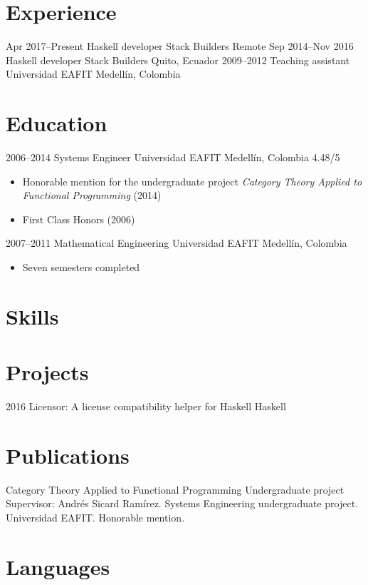 \documentclass[12pt,letterpaper,sans]{moderncv}
\begin{document}
\makecvtitle

\section{Experience}

\cventry
  {Apr 2017--Present}
  {Haskell developer}
  {Stack Builders}
  {Remote}
  {}
  {}
\cventry
  {Sep 2014--Nov 2016}
  {Haskell developer}
  {Stack Builders}
  {Quito, Ecuador}
  {}
  {}
\cventry
  {2009--2012}
  {Teaching assistant}
  {Universidad EAFIT}
  {Medellín, Colombia}
  {}
  {}

\section{Education}

\cventry
  {2006--2014}
  {Systems Engineer}
  {Universidad EAFIT}
  {Medellín, Colombia}
  {4.48/5}
  {
    \begin{itemize}
    \item
      Honorable mention for the undergraduate project \emph{Category
        Theory Applied to Functional Programming} (2014)
    \item
      First Class Honors (2006)
    \end{itemize}
  }
\cventry
  {2007--2011}
  {Mathematical Engineering}
  {Universidad EAFIT}
  {Medellín, Colombia}
  {}
  {
    \begin{itemize}
    \item
      Seven semesters completed
    \end{itemize}
  }

\section{Skills}


\section{Projects}

\cventry
  {2016}
  {}
  {Licensor: A license compatibility helper for Haskell}
  {Haskell}
  {}
  {}

\section{Publications}

  {Category Theory Applied to Functional Programming}
  {Undergraduate project}
  {}
  {}
  {
    Supervisor: Andrés Sicard Ramírez. Systems Engineering
    undergraduate project. Universidad EAFIT. Honorable mention.
  }

\section{Languages}

\end{document}
